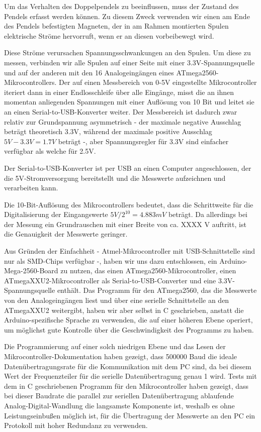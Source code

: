 Um das Verhalten des Doppelpendels zu beeinflussen, muss der Zustand des Pendels
erfasst werden können. Zu diesem Zweck verwenden wir einen am Ende des Pendels
befestigten Magneten, der in am Rahmen montierten Spulen elektrische Ströme
hervorruft, wenn er an diesen vorbeibewegt wird.

Diese Ströme verursachen Spannungsschwankungen an den Spulen. Um diese zu messen,
verbinden wir alle Spulen auf einer Seite mit einer 3.3V-Spannungsquelle und auf der
anderen mit den 16 Analogeingängen eines ATmega2560-Mikrocontrollers. Der auf einen
Messbereich von 0-5V eingestellte Mikrocontroller iteriert dann in einer Endlosschleife
über alle Eingänge, misst die an ihnen momentan anliegenden Spannungen mit einer
Auflösung von 10 Bit und leitet sie an einen Serial-to-USB-Konverter weiter. Der Messbereich
ist dadurch zwar relativ zur Grundspannung asymmetrisch - der maximale negative Ausschlag beträgt
theoretisch 3.3V, während der maximale positive Ausschlag $ 5V - 3.3V = 1.7V $ beträgt -, aber
Spannungsregler für 3.3V sind einfacher verfügbar als welche für 2.5V.

Der Serial-to-USB-Konverter ist per USB an einen Computer angeschlossen, der die 5V-Stromversorgung
bereitstellt und die Messwerte aufzeichnen und verarbeiten kann.

Die 10-Bit-Auflösung des Mikrocontrollers bedeutet, dass die Schrittweite für die Digitalisierung
der Eingangswerte $ 5V / 2^{10} = 4.883mV $ beträgt. Da allerdings bei der Messung ein
Grundrauschen mit einer Breite von ca. XXXX V auftritt, ist die Genauigkeit der Messwerte geringer.

Aus Gründen der Einfachheit - Atmel-Mikrocontroller mit USB-Schnittstelle sind nur als SMD-Chips
verfügbar -, haben wir uns dazu entschlossen, ein Arduino-Mega-2560-Board zu nutzen, das einen
ATmega2560-Mikrocontroller, einen ATmegaXXU2-Mikrocontroller als Serial-to-USB-Converter und eine
3.3V-Spannungsquelle enthält. Das Programm für den ATmega2560, das die Messwerte von den
Analogeingängen liest und über eine serielle Schnittstelle an den ATmegaXXU2 weitergibt, haben
wir aber selbst in C geschrieben, anstatt die Arduino-spezifische Sprache zu verwenden, die auf
einer höheren Ebene operiert, um möglichst gute Kontrolle über die Geschwindigkeit des Programms
zu haben.

Die Programmierung auf einer solch niedrigen Ebene und das Lesen der Mikrocontroller-Dokumentation
haben gezeigt, dass 500000 Baud die ideale Datenübertragungsrate für die Kommunikation mit dem PC
sind, da bei diesem Wert der Frequenzteiler für die serielle Datenübertragung genau 1 wird.
Tests mit dem in C geschriebenen Programm für den Mikrocontroller haben gezeigt, dass bei
dieser Baudrate die
parallel zur seriellen Datenübertragung ablaufende Analog-Digital-Wandlung die langsamste
Komponente ist, weshalb es ohne Leistungseinbußen möglich ist, für die Übertragung
der Messwerte an den PC ein Protokoll mit hoher Redundanz zu verwenden.

